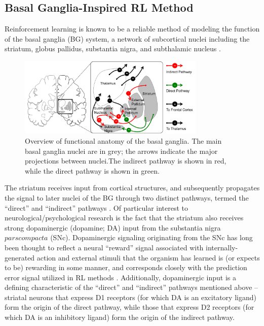 \documentclass[10pt,letterpaper]{article}
\begin{document}
\subsection{Basal Ganglia-Inspired RL Method}

Reinforcement learning is known to be a reliable method of modeling the function of the basal ganglia (BG) system, a network of subcortical nuclei including the striatum, globus pallidus, substantia nigra, and subthalamic nucleus \cite{alexander1990function}.

\begin{figure}[ht]
	\begin{center}
		\includegraphics[width=3.5in]{basal-ganglia.png}
	\end{center}
	\caption{Overview of functional anatomy of the basal ganglia. The main basal ganglia nuclei are in grey; the arrows indicate the major projections between nuclei.The indirect pathway is shown in red, while the direct pathway is shown in green.} 
	\label{bg}
\end{figure}

The striatum receives input from cortical structures, and subsequently propagates the signal to later nuclei of the BG through two distinct pathways, termed the ``direct'' and ``indirect'' pathways \cite{smith1998microcircuitry}. Of particular interest to neurological/psychological research is the fact that the striatum also receives strong dopaminergic (dopamine; DA) input from the substantia nigra $pars compacta$ (SNc). Dopaminergic signaling originating from the SNc has long been thought to reflect a neural ``reward'' signal associated with internally-generated action and external stimuli that the organism has learned is (or expects to be) rewarding in some manner, and corresponds closely with the prediction error signal utilized in RL methods \cite{schultz2000multuple, schultz1997neural}. Additionally, dopaminergic input is a defining characteristic of the ``direct'' and ``indirect'' pathways mentioned above -- striatal neurons that express D1 receptors (for which DA is an excitatory ligand) form the origin of the direct pathway, while those that express D2 receptors (for which DA is an inhibitory ligand) form the origin of the indirect pathway.
\end{document}
